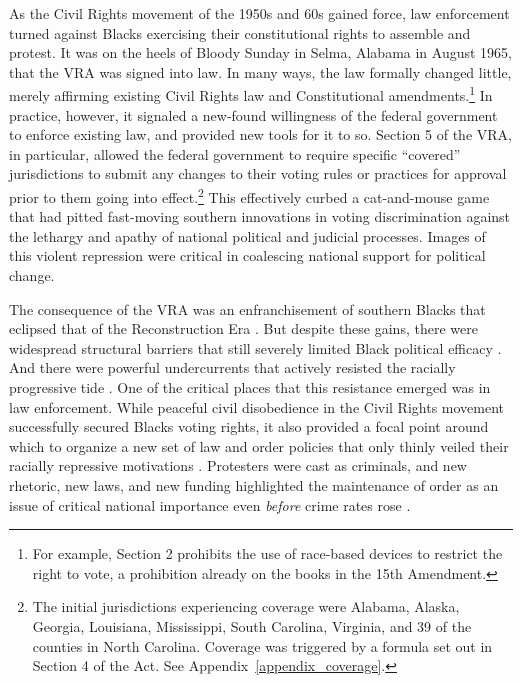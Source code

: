 \documentclass[12pt]{article}
\begin{document}
As the Civil Rights movement of the 1950s and 60s gained force, law enforcement turned against Blacks exercising their constitutional rights to assemble and protest.  It was on the heels of Bloody Sunday in Selma, Alabama in August 1965, that the VRA was signed into law.  In many ways, the law formally changed little, merely affirming existing Civil Rights law and Constitutional amendments.\footnote{For example, Section 2 prohibits the use of race-based devices to restrict the right to vote, a prohibition already on the books in the 15th Amendment.}  In practice, however, it signaled a new-found willingness of the federal government to enforce existing law, and provided new tools for it to so.  Section 5 of the VRA, in particular, allowed the federal government to require specific ``covered'' jurisdictions to submit any changes to their voting rules or practices for approval prior to them going into effect.\footnote{The initial jurisdictions experiencing coverage were Alabama, Alaska, Georgia, Louisiana, Mississippi, South Carolina, Virginia, and 39 of the counties in North Carolina.  Coverage was triggered by a formula set out in Section 4 of the Act.  See Appendix~\ref{appendix_coverage}.}  This effectively curbed a cat-and-mouse game that had pitted fast-moving southern innovations in voting discrimination against the lethargy and apathy of national political and judicial processes. Images of this violent repression were critical in coalescing national support for political change.

The consequence of the VRA was an enfranchisement of southern Blacks that eclipsed that of the Reconstruction Era .  But despite these gains, there were widespread structural barriers that still severely limited Black political efficacy .  And there were powerful undercurrents that actively resisted the racially progressive tide .  One of the critical places that this resistance emerged was in law enforcement.  While peaceful civil disobedience in the Civil Rights movement successfully secured Blacks voting rights, it also provided a focal point around which to organize a new set of law and order policies that only thinly veiled their racially repressive motivations .  Protesters were cast as criminals, and new rhetoric, new laws, and new funding highlighted the maintenance of order as an issue of critical national importance even \emph{before} crime rates rose .
\end{document}
